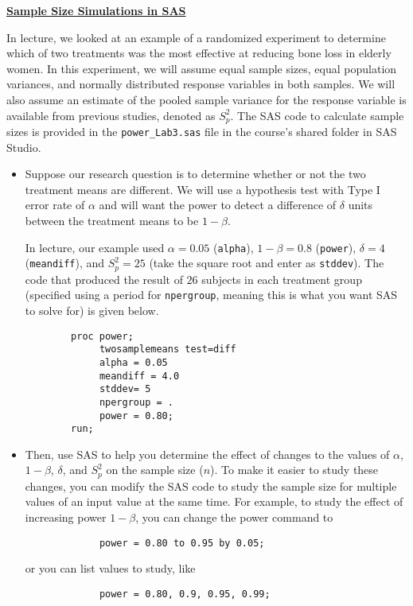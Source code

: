 \documentclass[11pt]{article}
\begin{document}
\newpage

\textbf{\underline{Sample Size Simulations in SAS}}

In lecture, we looked at an example of a randomized experiment to determine which of two treatments was the most effective at reducing bone loss in elderly women. In this experiment, we will assume equal sample sizes, equal population variances, and normally distributed response variables in both samples. We will also assume an estimate of the pooled sample variance for the response variable is available from previous studies, denoted as $S_p^2$. The SAS code to calculate sample sizes is provided in the \texttt{power\_Lab3.sas} file in the course's shared folder in SAS Studio.

\begin{itemize}
\item Suppose our research question is to determine whether or not the two treatment means are different.  We will use a hypothesis test with Type I error rate of $\alpha$ and will want the power to detect a difference of $\delta$ units between the treatment means to be $1-\beta$.

In lecture, our example used $\alpha=0.05$ (\texttt{alpha}), $1-\beta=0.8$ (\texttt{power}), $\delta=4$ (\texttt{meandiff}), and $S_p^2=25$ (take the square root and enter as \texttt{stddev}). The code that produced the result of $26$ subjects in each treatment group (specified using a period for \texttt{npergroup}, meaning this is what you want SAS to solve for) is given below. 
	\begin{verbatim}
		proc power;
		     twosamplemeans test=diff
		     alpha = 0.05
		     meandiff = 4.0
		     stddev= 5
		     npergroup = .
		     power = 0.80;
		run;
	\end{verbatim} 
\item Then, use SAS to help you determine the effect of changes to the values of $\alpha$, $1-\beta$, $\delta$, and $S_p^2$ on the sample size ($n$). To make it easier to study these changes, you can modify the SAS code to study the sample size for multiple values of an input value at the same time. For example, to study the effect of increasing power $1-\beta$, you can change the power command to
	\begin{verbatim}
		     power = 0.80 to 0.95 by 0.05;
	\end{verbatim}
	or you can list values to study, like
	\begin{verbatim}
		     power = 0.80, 0.9, 0.95, 0.99;
	\end{verbatim}


\end{itemize}
\end{document}
